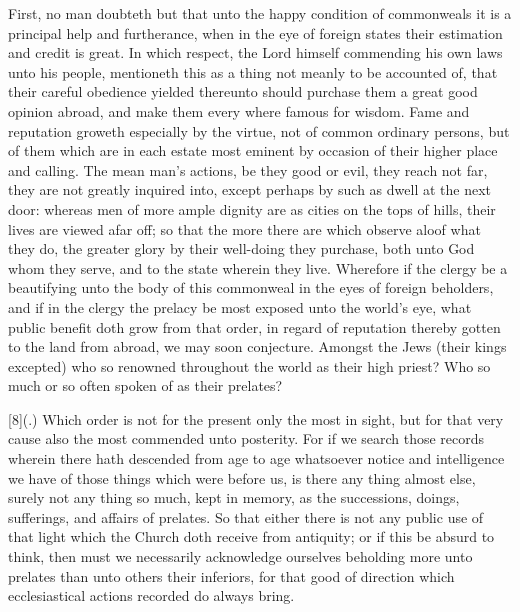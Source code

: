 First, no man doubteth but that unto the happy condition of commonweals it is a principal help and furtherance, when in the eye of foreign states their estimation and credit is great. In which respect, the Lord himself commending his own laws unto his people, mentioneth this as a thing not meanly to be accounted of, that their careful obedience yielded thereunto should purchase them a great good opinion abroad, and make them every where famous for wisdom. Fame and reputation groweth especially by the virtue, not of common ordinary persons, but of them which are in each estate most eminent by occasion of their higher place and calling. The mean man’s actions, be they good or evil, they reach not far, they are not greatly inquired into, except perhaps by such as dwell at the next door: whereas men of more ample dignity are as cities on the tops of hills, their lives are viewed afar off; so that the more there are which observe aloof what they do, the greater glory by their well-doing they purchase, both unto God whom they serve, and to the state wherein they live. Wherefore if the clergy be a beautifying unto the body of this commonweal in the eyes of foreign beholders, and if in the clergy the prelacy be most exposed unto the world’s eye, what public benefit doth grow from that order, in regard of reputation thereby gotten to the land from abroad, we may soon conjecture. Amongst the Jews (their kings excepted) who so renowned throughout the world as their high priest? Who so much or so often spoken of as their prelates?

[8](.) Which order is not for the present only the most in sight, but for that very cause also the most commended unto posterity. For if we search those records wherein there hath descended from age to age whatsoever notice and intelligence we have of those things which were before us, is there any thing almost else, surely not any thing so much, kept in memory, as the successions, doings, sufferings, and affairs of prelates. So that either there is not any public use of that light which the Church doth receive from antiquity; or if this be absurd to think, then must we necessarily acknowledge ourselves beholding more unto prelates than unto others their  inferiors, for that good of direction which ecclesiastical actions recorded do always bring.

